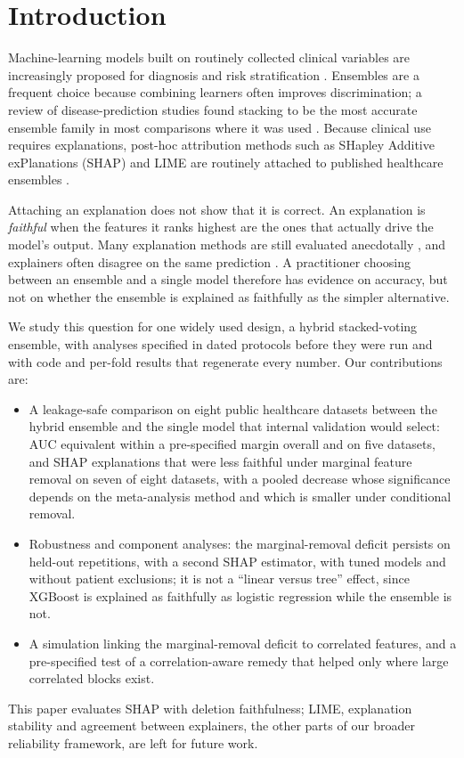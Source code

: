 \section{Introduction}
Machine-learning models built on routinely collected clinical variables are increasingly proposed for diagnosis and risk stratification \cite{topol}. Ensembles are a frequent choice because combining learners often improves discrimination; a review of disease-prediction studies found stacking to be the most accurate ensemble family in most comparisons where it was used \cite{mahajan}. Because clinical use requires explanations, post-hoc attribution methods such as SHapley Additive exPlanations (SHAP) and LIME are routinely attached to published healthcare ensembles \cite{lundberg2017}.

Attaching an explanation does not show that it is correct. An explanation is \emph{faithful} when the features it ranks highest are the ones that actually drive the model's output. Many explanation methods are still evaluated anecdotally \cite{nauta}, and explainers often disagree on the same prediction \cite{krishna}. A practitioner choosing between an ensemble and a single model therefore has evidence on accuracy, but not on whether the ensemble is explained as faithfully as the simpler alternative.

We study this question for one widely used design, a hybrid stacked-voting ensemble, with analyses specified in dated protocols before they were run and with code and per-fold results that regenerate every number. Our contributions are:
\begin{itemize}
\item A leakage-safe comparison on eight public healthcare datasets between the hybrid ensemble and the single model that internal validation would select: AUC equivalent within a pre-specified margin overall and on five datasets, and SHAP explanations that were less faithful under marginal feature removal on seven of eight datasets, with a pooled decrease whose significance depends on the meta-analysis method and which is smaller under conditional removal.
\item Robustness and component analyses: the marginal-removal deficit persists on held-out repetitions, with a second SHAP estimator, with tuned models and without patient exclusions; it is not a ``linear versus tree'' effect, since XGBoost is explained as faithfully as logistic regression while the ensemble is not.
\item A simulation linking the marginal-removal deficit to correlated features, and a pre-specified test of a correlation-aware remedy that helped only where large correlated blocks exist.
\end{itemize}
This paper evaluates SHAP with deletion faithfulness; LIME, explanation stability and agreement between explainers, the other parts of our broader reliability framework, are left for future work.

